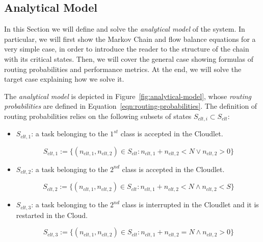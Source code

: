 \subsection{Analytical Model}
In this Section we will define and solve the \textit{analytical model} of the system.
%
In particular, we will first show the Markov Chain and flow balance equations for a very simple case, in order to introduce the reader to the structure of the chain with its critical states.
%
Then, we will cover the general case showing formulas of routing probabilities and performance metrics.
%
At the end, we will solve the target case explaining how we solve it.

The \textit{analytical model} is depicted in Figure~\ref{fig:analytical-model}, whose \textit{routing probabilities} are defined in Equation~\ref{eqn:routing-probabilities}.
The definition of routing probabilities relies on the following subsets of states $S_{clt,i} \subset S_{clt}$:

\begin{itemize}
	\item $S_{clt,1}$:  a task belonging to the $1^{st}$ class is accepted in the Cloudlet.
	
	\begin{equation}
	S_{clt,1} := \{(n_{clt,1},n_{clt,2})\in S_{clt} : n_{clt,1}+n_{clt,2}<N \vee n_{clt,2}>0\}
	\end{equation}
	
	\item $S_{clt,2}$: a task belonging to the $2^{nd}$ class is accepted in the Cloudlet.
	
	\begin{equation}
	S_{clt,2} := \{(n_{clt,1},n_{clt,2})\in S_{clt} : n_{clt,1}+n_{clt,2}<N \wedge n_{clt,2}<S\}
	\end{equation}
	
	\item $S_{clt,3}$: a task belonging to the $2^{nd}$ class is interrupted in the Cloudlet and it is restarted in the Cloud.
	
	\begin{equation}
	S_{clt,3} := \{(n_{clt,1},n_{clt,2})\in S_{clt} : n_{clt,1}+n_{clt,2}=N \wedge n_{clt,2}>0\}
	\end{equation}
\end{itemize}

